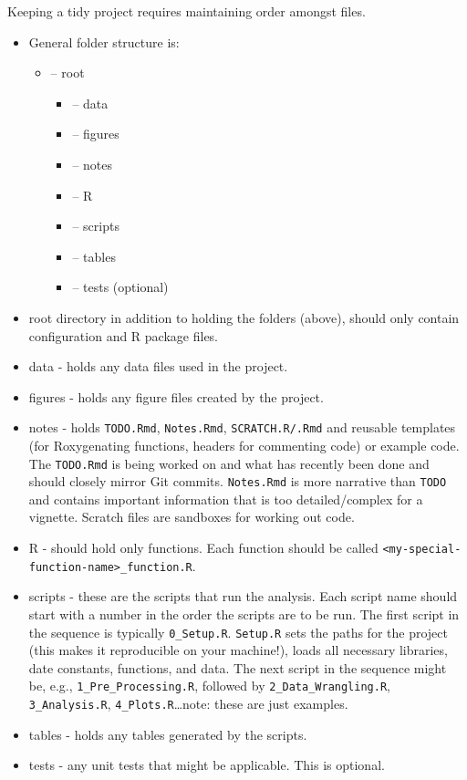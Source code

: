 \documentclass[
  letterpaper,
  DIV=11,
  numbers=noendperiod]{scrreprt}
\providecommand{\tightlist}{%
  \setlength{\itemsep}{0pt}\setlength{\parskip}{0pt}}\usepackage{longtable,booktabs,array}
\begin{document}
Keeping a tidy project requires maintaining order amongst files.

\begin{itemize}
\item
  General folder structure is:

  \begin{itemize}
  \tightlist
  \item
    -- root

    \begin{itemize}
    \tightlist
    \item
      -- data
    \item
      -- figures
    \item
      -- notes
    \item
      -- R
    \item
      -- scripts
    \item
      -- tables
    \item
      -- tests (optional)
    \end{itemize}
  \end{itemize}
\item
  root directory in addition to holding the folders (above), should only
  contain configuration and R package files.
\item
  data - holds any data files used in the project.
\item
  figures - holds any figure files created by the project.
\item
  notes - holds \texttt{TODO.Rmd}, \texttt{Notes.Rmd},
  \texttt{SCRATCH.R/.Rmd} and reusable templates (for Roxygenating
  functions, headers for commenting code) or example code. The
  \texttt{TODO.Rmd} is being worked on and what has recently been done
  and should closely mirror Git commits. \texttt{Notes.Rmd} is more
  narrative than \texttt{TODO} and contains important information that
  is too detailed/complex for a vignette. Scratch files are sandboxes
  for working out code.
\item
  R - should hold only functions. Each function should be called
  \texttt{\textless{}my-special-function-name\textgreater{}\_function.R}.
\item
  scripts - these are the scripts that run the analysis. Each script
  name should start with a number in the order the scripts are to be
  run. The first script in the sequence is typically
  \texttt{0\_Setup.R}. \texttt{Setup.R} sets the paths for the project
  (this makes it reproducible on your machine!), loads all necessary
  libraries, date constants, functions, and data. The next script in the
  sequence might be, e.g., \texttt{1\_Pre\_Processing.R}, followed by
  \texttt{2\_Data\_Wrangling.R}, \texttt{3\_Analysis.R},
  \texttt{4\_Plots.R}\ldots note: these are just examples.
\item
  tables - holds any tables generated by the scripts.
\item
  tests - any unit tests that might be applicable. This is optional.
\end{itemize}
\end{document}
